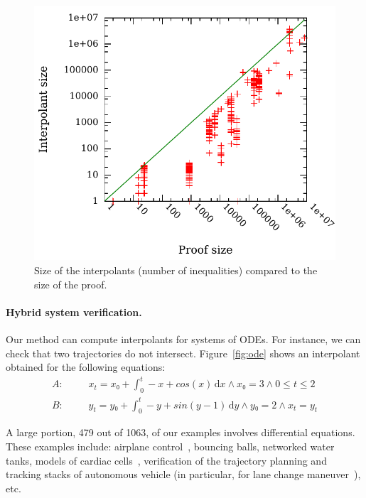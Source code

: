 \begin{figure}
\centering
\includegraphics[scale=0.6]{img/itpsize2.pdf}
\caption{Size of the interpolants (number of inequalities) compared to the size of the proof.}
\label{fig:flyspeck}
\end{figure}


\paragraph{Hybrid system verification.}
Our method can compute interpolants for systems of ODEs.
For instance, we can check that two trajectories do not intersect.
Figure~\ref{fig:ode} shows an interpolant obtained for the following equations:
\begin{eqnarray*}
A: &~~~~&  x_t = x₀ + \int_0^t \! -x + cos(x) \, \mathrm{d}x ∧ x₀ = 3 ∧ 0 ≤ t ≤ 2 \\
B: &~~~~&  y_t = y₀ + \int_0^t \! -y + sin(y-1) \, \mathrm{d}y ∧ y₀ = 2 ∧ x_t = y_t
\end{eqnarray*}

A large portion, 479 out of 1063, of our examples involves differential equations.
These examples include:
airplane control~\cite{Bae201513},
bouncing balls, networked water tanks,
models of cardiac cells~\cite{DBLP:conf/cmsb/LiuKGZC14},
verification of the trajectory planning and tracking stacks of autonomous vehicle (in particular, for lane change maneuver~\cite{althoff2014online}),
etc.


